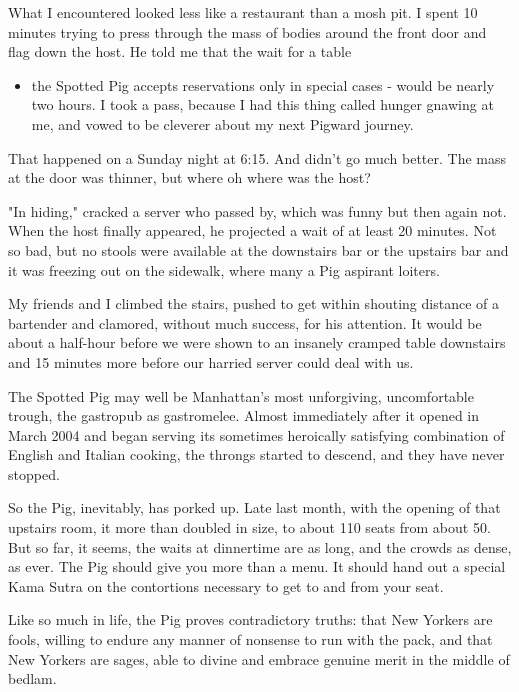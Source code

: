 What I encountered looked less like a restaurant than a mosh pit. I
spent 10 minutes trying to press through the mass of bodies around the
front door and flag down the host. He told me that the wait for a table

\begin{itemize}
\tightlist
\item
  the Spotted Pig accepts reservations only in special cases - would be
  nearly two hours. I took a pass, because I had this thing called
  hunger gnawing at me, and vowed to be cleverer about my next Pigward
  journey.
\end{itemize}

That happened on a Sunday night at 6:15. And didn't go much better. The
mass at the door was thinner, but where oh where was the host?

"In hiding," cracked a server who passed by, which was funny but then
again not. When the host finally appeared, he projected a wait of at
least 20 minutes. Not so bad, but no stools were available at the
downstairs bar or the upstairs bar and it was freezing out on the
sidewalk, where many a Pig aspirant loiters.

My friends and I climbed the stairs, pushed to get within shouting
distance of a bartender and clamored, without much success, for his
attention. It would be about a half-hour before we were shown to an
insanely cramped table downstairs and 15 minutes more before our harried
server could deal with us.

The Spotted Pig may well be Manhattan's most unforgiving, uncomfortable
trough, the gastropub as gastromelee. Almost immediately after it opened
in March 2004 and began serving its sometimes heroically satisfying
combination of English and Italian cooking, the throngs started to
descend, and they have never stopped.

So the Pig, inevitably, has porked up. Late last month, with the opening
of that upstairs room, it more than doubled in size, to about 110 seats
from about 50. But so far, it seems, the waits at dinnertime are as
long, and the crowds as dense, as ever. The Pig should give you more
than a menu. It should hand out a special Kama Sutra on the contortions
necessary to get to and from your seat.

Like so much in life, the Pig proves contradictory truths: that New
Yorkers are fools, willing to endure any manner of nonsense to run with
the pack, and that New Yorkers are sages, able to divine and embrace
genuine merit in the middle of bedlam.

